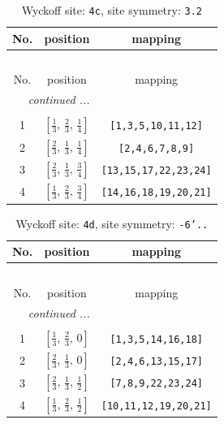 \documentclass[fleqn,8pt]{jsarticle}
\begin{document}
\renewcommand{\arraystretch}{1.2}
\begin{longtable}{ccc}
\caption{Wyckoff site: {\tt 4c}, site symmetry: {\tt 3.2}}
 \\
 \hline \hline
No. & position & mapping \\ \hline \endfirsthead

\multicolumn{2}{l}{\tablename\ \thetable{}} \\
 \hline \hline
No. & position & mapping \\ \hline \endhead

 \hline \hline
\multicolumn{2}{r}{\footnotesize\it continued ...} \\ \endfoot

 \hline \hline
\multicolumn{2}{r}{} \\ \endlastfoot

1 & $\left[ \frac{1}{3},\, \frac{2}{3},\, \frac{1}{4} \right]$ & {\tt [1,3,5,10,11,12]} \\ \hline
2 & $\left[ \frac{2}{3},\, \frac{1}{3},\, \frac{1}{4} \right]$ & {\tt [2,4,6,7,8,9]} \\ \hline
3 & $\left[ \frac{2}{3},\, \frac{1}{3},\, \frac{3}{4} \right]$ & {\tt [13,15,17,22,23,24]} \\ \hline
4 & $\left[ \frac{1}{3},\, \frac{2}{3},\, \frac{3}{4} \right]$ & {\tt [14,16,18,19,20,21]} \\
\end{longtable}
\renewcommand{\arraystretch}{1.2}
\begin{longtable}{ccc}
\caption{Wyckoff site: {\tt 4d}, site symmetry: {\tt -6'..}}
 \\
 \hline \hline
No. & position & mapping \\ \hline \endfirsthead

\multicolumn{2}{l}{\tablename\ \thetable{}} \\
 \hline \hline
No. & position & mapping \\ \hline \endhead

 \hline \hline
\multicolumn{2}{r}{\footnotesize\it continued ...} \\ \endfoot

 \hline \hline
\multicolumn{2}{r}{} \\ \endlastfoot

1 & $\left[ \frac{1}{3},\, \frac{2}{3},\, 0 \right]$ & {\tt [1,3,5,14,16,18]} \\ \hline
2 & $\left[ \frac{2}{3},\, \frac{1}{3},\, 0 \right]$ & {\tt [2,4,6,13,15,17]} \\ \hline
3 & $\left[ \frac{2}{3},\, \frac{1}{3},\, \frac{1}{2} \right]$ & {\tt [7,8,9,22,23,24]} \\ \hline
4 & $\left[ \frac{1}{3},\, \frac{2}{3},\, \frac{1}{2} \right]$ & {\tt [10,11,12,19,20,21]} \\
\end{longtable}
\end{document}
